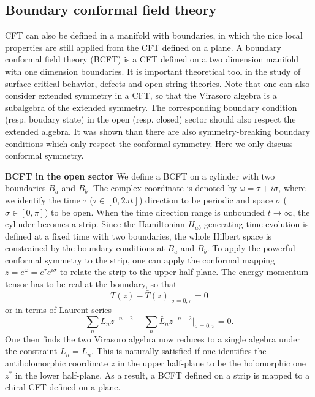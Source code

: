 \documentclass[submission, PhysLectNotes]{SciPost}
\begin{document}
\subsection{Boundary conformal field theory}
CFT can also be defined in a manifold with boundaries, in which the nice local properties are still applied from the CFT defined on a plane. A boundary conformal field theory (BCFT) is a CFT defined on a two dimension manifold with one dimension boundaries. It is important theoretical tool in the study of surface critical behavior, defects and open string theories. Note that one can also consider extended symmetry in a CFT, so that the Virasoro algebra is a subalgebra of the extended symmetry. The corresponding boundary condition (resp. boudary state) in the open (resp. closed) sector should also respect the extended algebra. It was shown than there are also symmetry-breaking boundary conditions which only respect the conformal symmetry. Here we only discuss conformal symmetry. 

{\bf BCFT in the open sector}
We define a BCFT on a cylinder with two boundaries $B_a$ and $B_b$. The complex coordinate is denoted by $\omega = \tau + i \sigma$, where we identify the time $\tau$ ($\tau \in [0,2\pi t]$) direction to be periodic and space $\sigma$ ($\sigma \in [0,\pi]$) to be open. When the time direction range is unbounded $t\rightarrow\infty$, the cylinder becomes a strip. Since the Hamiltonian $H_{ab}$ generating time evolution is defined at a fixed time with two boundaries, the whole Hilbert space is constrained by the boundary conditions at $B_a$ and $B_b$. To apply the powerful conformal symmetry to the strip, one can apply the conformal mapping $z = e^\omega = e^\tau e^{i\sigma}$ to relate the strip to the upper half-plane. The energy-momentum tensor has to be real at the boundary, so that
\begin{equation} \label{Eq_T_open}
    T(z) - \bar{T}(\bar{z})\vert_{\sigma=0,\pi} = 0
\end{equation}
or in terms of Laurent series 
\begin{equation}
    \sum_n L_n z^{-n-2} - \sum_n \bar{L}_n \bar{z}^{-n-2}\vert_{\sigma=0,\pi} = 0. 
\end{equation}
One then finds the two Virasoro algebra now reduces to a single algebra under the constraint $L_n = \bar{L}_n$. This is naturally satisfied if one identifies the antiholomorphic coordinate $\bar{z}$ in the upper half-plane to be the holomorphic one $z^*$ in the lower half-plane. As a result, a BCFT defined on a strip is mapped to a chiral CFT defined on a plane. 
\end{document}
